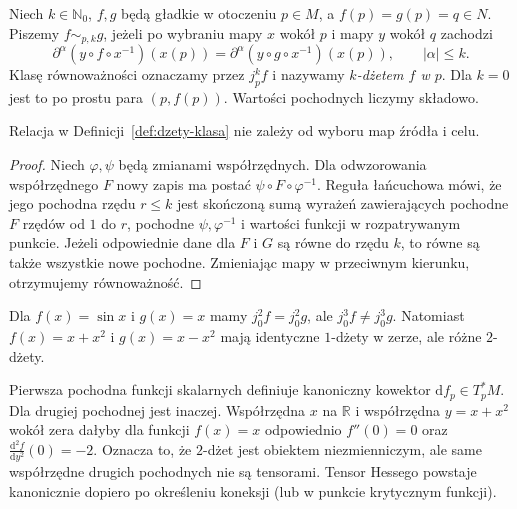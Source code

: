\begin{definicja}
\label{def:dzety-klasa}
Niech $k\in\mathbb N_0$, $f,g$ będą gładkie w otoczeniu $p\in M$,
a $f(p)=g(p)=q\in N$. Piszemy $f\sim_{p,k}g$, jeżeli
po wybraniu mapy $x$ wokół $p$ i mapy $y$ wokół $q$ zachodzi
\[
 \partial^\alpha (y\circ f\circ x^{-1})(x(p))
 =\partial^\alpha (y\circ g\circ x^{-1})(x(p)),
 \qquad |\alpha|\le k.
\]
Klasę równoważności oznaczamy przez $j_p^k f$ i nazywamy
\emph{$k$-dżetem $f$ w $p$}. Dla $k=0$ jest to po prostu para
$(p,f(p))$. Wartości pochodnych liczymy składowo.
\end{definicja}

\begin{lemat}
\label{lem:dzety-mapy}
Relacja w Definicji~\ref{def:dzety-klasa} nie zależy od wyboru
map źródła i celu.
\end{lemat}
\begin{proof}
Niech $\varphi,\psi$ będą zmianami współrzędnych.
Dla odwzorowania współrzędnego $F$ nowy zapis ma postać
$\psi\circ F\circ\varphi^{-1}$. Reguła łańcuchowa mówi,
że jego pochodna rzędu $r\le k$ jest skończoną sumą wyrażeń
zawierających pochodne $F$ rzędów od $1$ do $r$, pochodne
$\psi,\varphi^{-1}$ i wartości funkcji w rozpatrywanym punkcie.
Jeżeli odpowiednie dane dla $F$ i $G$ są równe do rzędu $k$,
to równe są także wszystkie nowe pochodne. Zmieniając mapy
w przeciwnym kierunku, otrzymujemy równoważność.
\end{proof}

\begin{przyklad}
\label{ex:dzety-taylor}
Dla $f(x)=\sin x$ i $g(x)=x$ mamy $j_0^2f=j_0^2g$,
ale $j_0^3f\ne j_0^3g$. Natomiast $f(x)=x+x^2$
i $g(x)=x-x^2$ mają identyczne $1$-dżety w zerze,
ale różne $2$-dżety.
\end{przyklad}

\begin{uwaga}
\label{rem:dzety-hess}
Pierwsza pochodna funkcji skalarnych definiuje kanoniczny
kowektor $\mathrm df_p\in T_p^*M$. Dla drugiej pochodnej jest inaczej.
Współrzędna $x$ na $\mathbb R$ i współrzędna $y=x+x^2$ wokół zera
dałyby dla funkcji $f(x)=x$ odpowiednio $f''(0)=0$
oraz $\frac{\mathrm d^2 f}{\mathrm dy^2}(0)=-2$.
Oznacza to, że $2$-dżet jest obiektem niezmienniczym,
ale same współrzędne drugich pochodnych nie są tensorami.
Tensor Hessego powstaje kanonicznie dopiero po określeniu
koneksji (lub w punkcie krytycznym funkcji).
\end{uwaga}

